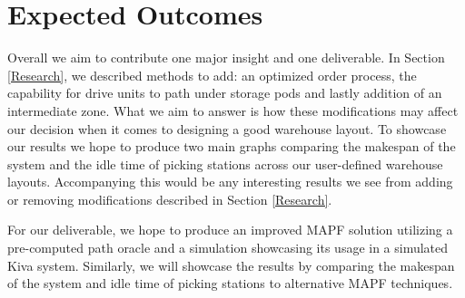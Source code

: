 \documentclass[a4paper,11pt]{article}
\begin{document}
\section{Expected Outcomes}
Overall we aim to contribute one major insight and one deliverable. In Section \ref{Research}, we described methods to add: an optimized order process, the capability for drive units to path under storage pods and lastly addition of an intermediate zone. What we aim to answer is how these modifications may affect our decision when it comes to designing a good warehouse layout. To showcase our results we hope to produce two main graphs comparing the makespan of the system and the idle time of picking stations across our user-defined warehouse layouts. Accompanying this would be any interesting results we see from adding or removing modifications described in Section \ref{Research}. 

For our deliverable, we hope to produce an improved MAPF solution utilizing a pre-computed path oracle and a simulation showcasing its usage in a simulated Kiva system. Similarly, we will showcase the results by comparing the makespan of the system and idle time of picking stations to alternative MAPF techniques.



\end{document}
